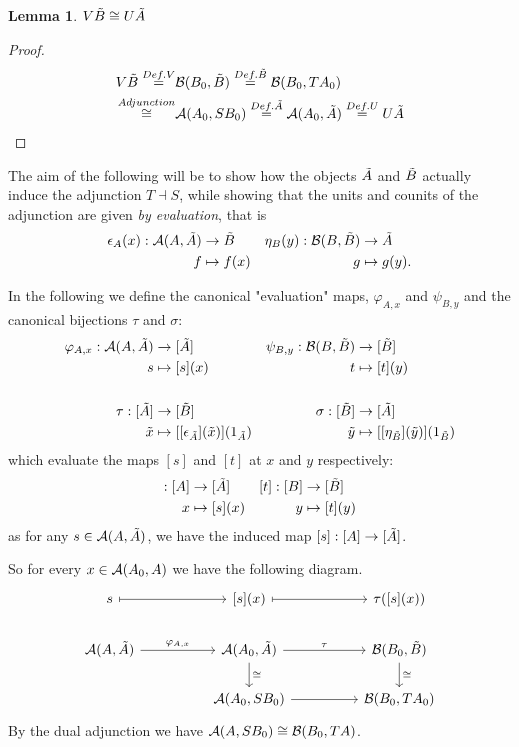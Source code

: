 \documentclass[12pt,a4paper]{article}
\newtheorem{lemma}{Lemma}[section] %
\def\HomA{\ensuremath\mathcal{A}}
\def\HomB{\ensuremath\mathcal{B}}
\def\t{\ensuremath\tilde}
\begin{document}
\begin{lemma}
	$V \t B \cong U \t A$
\end{lemma}
\begin{proof}
	\begin{align*}
		V \t B \stackrel{Def. V}{=}& \HomB(B_0,\t B) \stackrel{Def. \t B}{=} \HomB(B_0, TA_0)\\ \stackrel{Adjunction}{\cong}& \HomA(A_0,SB_0) \stackrel{Def. \t A}{=}\HomA(A_0,\t A) \stackrel{Def. U}{=} U\t A
	\end{align*} \end{proof}
	
	The aim of the following will be to show how the objects $\t A$ and $\t B$ actually induce the adjunction $T \dashv S$, while showing that the units and counits of the adjunction are given \emph{by evaluation}, that is \begin{align*}
		\epsilon_A(x): \HomA(A, \t A) &\to \t B& \eta_B(y) : \HomB(B, \t 
		B) &\to \t A\\
		f & \mapsto f(x)& g &\mapsto g(y).
	\end{align*}
	
	In the following we define the canonical "evaluation" maps, $\varphi_{A, x}$ and $\psi_{B, y}$ and the canonical bijections $\tau$ and $\sigma$:  
\begin{align*}
	\varphi_{A, x} : \HomA(A, \t A) &\to [\t A ]& \psi_{B, y} : \HomB(B, \t B) &\to [\t B ]\\
	 s &\mapsto [s](x) &t &\mapsto [t](y) \\\\
	 \tau: [\t A] &\to [\t B]&\sigma: [\t B] &\to [\t A]\\
	 \t x &\mapsto  [[\epsilon_{\t A}](\t x)](1_{\t A})&\t y &\mapsto  [[\eta_{\t B}](\t y)](1_{\t B})
\end{align*}
which evaluate the maps $[s]$ and $[t]$ at $x$ and $y$ respectively:
\begin{align*}
	[s]: [A] &\to [\t A]&[t]: [B] &\to [\t B]\\
	x &\mapsto [s](x)& y &\mapsto [t](y)
\end{align*}
as for any $s \in \HomA(A, \t A) $, we have the induced map $[s]: [A] \to [\t A]$.

So for every $x \in \HomA(A_0,  A)$ we have the following diagram.
\[\begin{tikzcd}
	s && {[s](x)} && {\tau([s](x))} \\
	\HomA(A, \t A) && \HomA(A_0, \t A) && \HomB(B_0, \t B) \\
	&& \HomA(A_0, SB_0) && \HomB(B_0, TA_0)
	\arrow[maps to, from=1-1, to=1-3]
	\arrow[maps to, from=1-3, to=1-5]
	\arrow["\varphi_{A,x}", from=2-1, to=2-3]
	\arrow["\tau", from=2-3, to=2-5]
	\arrow["\cong",from=2-3, to=3-3]
	\arrow["\cong",from=2-5, to=3-5]
	\arrow[from=3-3, to=3-5]
\end{tikzcd}\]
By the dual adjunction we have $\HomA(A, SB_0) \cong \HomB(B_0, TA)$.
\end{document}
